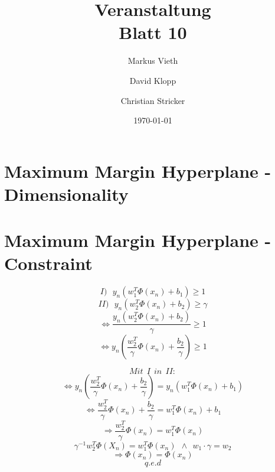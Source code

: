 \documentclass[a4paper,11pt,twoside]{scrartcl}
\title{Veranstaltung\\ Blatt 10}
\author{Markus Vieth\and David Klopp\and Christian Stricker}
\date{\today}
\begin{document}
\newcommand{\cor}[1]{\textcolor{red}{\textit{#1}}}
\maketitle
\cleardoublepage
\pagestyle{myheadings}

\newpage

\section*{Maximum Margin Hyperplane - Dimensionality}

\section*{Maximum Margin Hyperplane - Constraint}
\[I )~~~y_n (w_1^T \Phi(x_n) + b_1) \geq 1 \]
\[II)~~~y_n (w_2^T \Phi(x_n) + b_2) \geq \gamma \]
\[ \Leftrightarrow \frac{y_n (w_2^T \Phi(x_n) + b_2)}{\gamma} \geq 1 \]
\[ \Leftrightarrow y_n \left (\frac{w_2^T}{\gamma} \Phi(x_n) + \frac{b_2}{\gamma} \right) \geq 1 \]

\[Mit~~ I~~in ~~II: \]
\[ \Leftrightarrow y_n \left (\frac{w_2^T}{\gamma} \Phi(x_n) + \frac{b_2}{\gamma} \right) = y_n (w_1^T \Phi(x_n) + b_1) \]
\[ \Leftrightarrow \frac{w_2^T}{\gamma} \Phi(x_n) + \frac{b_2}{\gamma} = w_1^T \Phi(x_n) + b_1 \]
\[ \Rightarrow \frac{w_2^T}{\gamma} \Phi(x_n) = w_1^T \Phi(x_n) \]
\[ \gamma^{-1} w_2^T \Phi(X_n) = w_1^T \Phi(x_n)~~\land~~w_1 \cdot \gamma = w_2 \]
\[ \Rightarrow \Phi(x_n) = \Phi(x_n) \]
\[q.e.d\]
\end{document}
